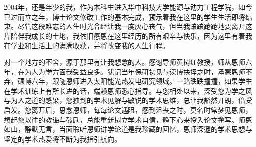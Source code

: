 \backmatter
\begin{ack}
%  
%  
%  
%  

%
%
%
2004年，还是年少的我，作为本科生进入华中科技大学能源与动力工程学院，如今已过而立之年，博士论文修改工作的基本完成，预示着我在这里的学生生活即将结束。尽管这段难忘的人生时光曾经让我一度灰心丧气，但当我踉踉跄跄地要离开这片陪伴我成长的土地，我依旧感恩在这里经历的所有艰辛与快乐，因为这里有着我在学业和生活上的满满收获，并将改变我的人生行程。

对一个地方的不舍，源于那里有让我想念的人。感谢导师黄树红教授，师从恩师六年，在为人为学方面我受益良多。犹记当年保研初见与读博抉择之时，承蒙恩师不弃，硕博六年，跟随恩师进入太阳能光热发电研究领域。一路跌跌撞撞，如果学生在学术训练上有所长进的话，端赖恩师悉心指导。与您相处以来，深受您为学之风与为人之道的感染，您独到的学术见解与敏锐的学术思维，总让我豁然开朗，倍受启发。您离开后，思念恩师，每每论文遇阻，感到沮丧之时，莫名时常梦见恩师，想起您以往的教诲与鼓励，总能重新树立学术自信，静下心来投入论文撰写。师恩如山，静默无言，当面聆听恩师讲学论道是我珍藏的回忆，恩师深邃的学术思想与坚定的学术热爱将不断为我指引航向。


\end{ack}
